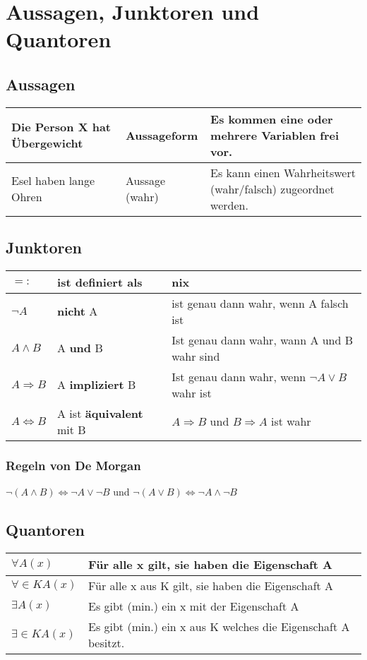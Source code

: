 \chapter{Aussagen, Junktoren und Quantoren}
\section{Aussagen}
\begin{longtable}{|p{}|p{}|p{}|}
	\hline
	Die Person X hat Übergewicht & Aussageform & Es kommen eine oder mehrere Variablen frei vor. \\
	\hline
	Esel haben lange Ohren & Aussage (wahr) & Es kann einen Wahrheitswert (wahr/falsch) zugeordnet werden. \\
	\hline
\end{longtable}

\section{Junktoren}
\begin{longtable}{|l|l|l|}
	\hline
	\(=:\) & ist definiert als & nix \\
	\hline
	\(\neg A\) & \textbf{nicht} A & ist genau dann wahr, wenn A falsch ist \\
	\hline
	\( A \wedge B \) & A \textbf{und} B & Ist genau dann wahr, wann A und B wahr sind \\
	\hline
	\( A \Rightarrow B \) & A \textbf{impliziert} B & Ist genau dann wahr, wenn \(\neg A \vee B \) wahr ist \\
	\hline
	\( A \Leftrightarrow B \) & A ist \textbf{äquivalent} mit B & \(A \Rightarrow B \) und \(B \Rightarrow A \) ist wahr \\
	\hline
\end{longtable}

\subsection{Regeln von De Morgan}
\( \neg (A \wedge B) \Leftrightarrow \neg A \vee \neg B\) und \(\neg (A \vee B) \Leftrightarrow \neg A \wedge \neg B \)

\section{Quantoren}
\begin{longtable}{|p{}|p{}|}
	\hline
	\( \forall A(x) \) & Für alle x gilt, sie haben die Eigenschaft A \\
	\hline
	\( \forall \in K A(x) \) & Für alle x aus K gilt, sie haben die Eigenschaft A \\
	\hline
	\( \exists A(x) \) & Es gibt (min.) ein x mit der Eigenschaft A \\
	\hline
	\( \exists \in K A(x) \) & Es gibt (min.) ein x aus K welches die Eigenschaft A besitzt. \\
	\hline
\end{longtable}
\pagebreak

